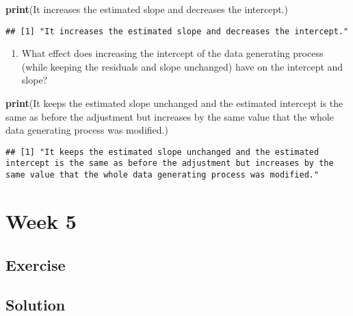 \documentclass[
]{book}
\newenvironment{Shaded}{\begin{snugshade}}{\end{snugshade}}
\newcommand{\FunctionTok}[1]{\textcolor[rgb]{0.13,0.29,0.53}{\textbf{#1}}}
\newcommand{\NormalTok}[1]{#1}
\newcommand{\StringTok}[1]{\textcolor[rgb]{0.31,0.60,0.02}{#1}}
\providecommand{\tightlist}{%
  \setlength{\itemsep}{0pt}\setlength{\parskip}{0pt}}
\begin{document}
\begin{Shaded}
\begin{Highlighting}[]
\FunctionTok{print}\NormalTok{(}\StringTok{\textquotesingle{}It increases the estimated slope and decreases the intercept.\textquotesingle{}}\NormalTok{)}
\end{Highlighting}
\end{Shaded}

\begin{verbatim}
## [1] "It increases the estimated slope and decreases the intercept."
\end{verbatim}

\begin{enumerate}
\def\labelenumi{\roman{enumi}.}
\setcounter{enumi}{3}
\tightlist
\item
  What effect does increasing the intercept of the data generating process (while keeping the residuals and slope unchanged) have on the intercept and slope?
\end{enumerate}

\begin{Shaded}
\begin{Highlighting}[]
\FunctionTok{print}\NormalTok{(}\StringTok{\textquotesingle{}It keeps the estimated slope unchanged and the estimated intercept is the same as before the adjustment but increases by the same value that the whole data generating process was modified.\textquotesingle{}}\NormalTok{)}
\end{Highlighting}
\end{Shaded}

\begin{verbatim}
## [1] "It keeps the estimated slope unchanged and the estimated intercept is the same as before the adjustment but increases by the same value that the whole data generating process was modified."
\end{verbatim}

\hypertarget{week-5}{%
\chapter{Week 5}\label{week-5}}

\hypertarget{exercise-1}{%
\section{Exercise}\label{exercise-1}}

\hypertarget{solution-1}{%
\section{Solution}\label{solution-1}}
\end{document}

